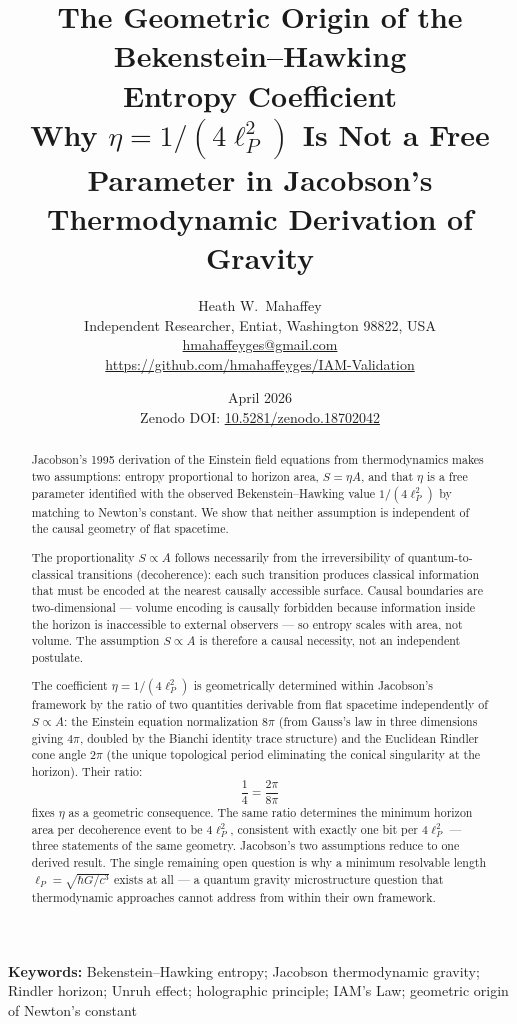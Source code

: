 \documentclass[12pt,a4paper]{article}
\title{\textbf{The Geometric Origin of the Bekenstein--Hawking\\
Entropy Coefficient}\\[0.5em]
\large Why $\eta = 1/(4\ell_P^2)$ Is Not a Free Parameter
in Jacobson's Thermodynamic Derivation of Gravity}
\author{Heath W.\ Mahaffey\\
\small Independent Researcher, Entiat, Washington 98822, USA\\
\small \href{mailto:hmahaffeyges@gmail.com}{hmahaffeyges@gmail.com}\\
\small \url{https://github.com/hmahaffeyges/IAM-Validation}}
\date{April 2026\\
\small Zenodo DOI:
\href{https://doi.org/10.5281/zenodo.18702042}{10.5281/zenodo.18702042}}
\begin{document}
\maketitle

\begin{abstract}
Jacobson's 1995 derivation of the Einstein field equations from
thermodynamics makes two assumptions: entropy proportional to horizon
area, $S = \eta A$, and that $\eta$ is a free parameter identified
with the observed Bekenstein--Hawking value $1/(4\ell_P^2)$ by matching
to Newton's constant. We show that neither assumption is independent
of the causal geometry of flat spacetime.

The proportionality $S \propto A$ follows necessarily from the
irreversibility of quantum-to-classical transitions (decoherence): each
such transition produces classical information that must be encoded at
the nearest causally accessible surface. Causal boundaries are
two-dimensional --- volume encoding is causally forbidden because
information inside the horizon is inaccessible to external observers
--- so entropy scales with area, not volume. The assumption $S \propto A$
is therefore a causal necessity, not an independent postulate.

The coefficient $\eta = 1/(4\ell_P^2)$ is geometrically determined
within Jacobson's framework by the ratio of two quantities derivable
from flat spacetime independently of $S \propto A$: the Einstein
equation normalization $8\pi$ (from Gauss's law in three dimensions
giving $4\pi$, doubled by the Bianchi identity trace structure) and
the Euclidean Rindler cone angle $2\pi$ (the unique topological period
eliminating the conical singularity at the horizon). Their ratio:
\begin{equation*}
\frac{1}{4} = \frac{2\pi}{8\pi}
\end{equation*}
fixes $\eta$ as a geometric consequence. The same ratio determines
the minimum horizon area per decoherence event to be $4\ell_P^2$,
consistent with exactly one bit per $4\ell_P^2$ --- three statements
of the same geometry. Jacobson's two assumptions reduce to one
derived result. The single remaining open question is why a minimum
resolvable length $\ell_P = \sqrt{\hbar G/c^3}$ exists at all ---
a quantum gravity microstructure question that thermodynamic
approaches cannot address from within their own framework.
\end{abstract}

\noindent\textbf{Keywords:} Bekenstein--Hawking entropy; Jacobson
thermodynamic gravity; Rindler horizon; Unruh effect; holographic principle;
IAM's Law; geometric origin of Newton's constant
\end{document}
